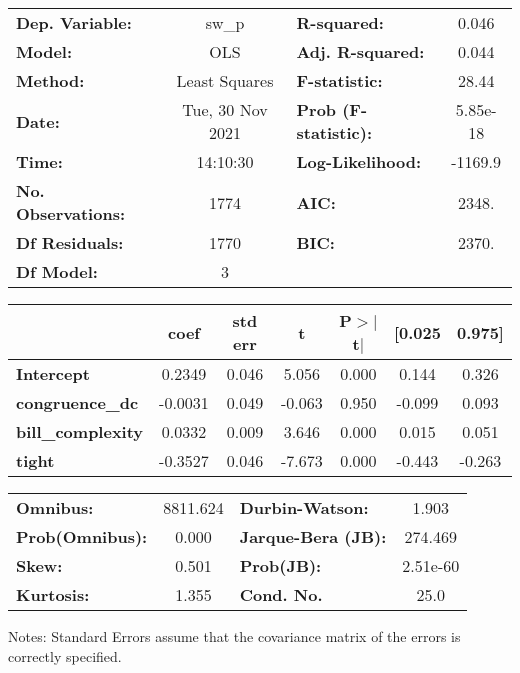 \begin{center}
\begin{tabular}{lclc}
\toprule
\textbf{Dep. Variable:}    &      sw\_p       & \textbf{  R-squared:         } &     0.046   \\
\textbf{Model:}            &       OLS        & \textbf{  Adj. R-squared:    } &     0.044   \\
\textbf{Method:}           &  Least Squares   & \textbf{  F-statistic:       } &     28.44   \\
\textbf{Date:}             & Tue, 30 Nov 2021 & \textbf{  Prob (F-statistic):} &  5.85e-18   \\
\textbf{Time:}             &     14:10:30     & \textbf{  Log-Likelihood:    } &   -1169.9   \\
\textbf{No. Observations:} &        1774      & \textbf{  AIC:               } &     2348.   \\
\textbf{Df Residuals:}     &        1770      & \textbf{  BIC:               } &     2370.   \\
\textbf{Df Model:}         &           3      & \textbf{                     } &             \\
\bottomrule
\end{tabular}
\begin{tabular}{lcccccc}
                          & \textbf{coef} & \textbf{std err} & \textbf{t} & \textbf{P$> |$t$|$} & \textbf{[0.025} & \textbf{0.975]}  \\
\midrule
\textbf{Intercept}        &       0.2349  &        0.046     &     5.056  &         0.000        &        0.144    &        0.326     \\
\textbf{congruence\_dc}   &      -0.0031  &        0.049     &    -0.063  &         0.950        &       -0.099    &        0.093     \\
\textbf{bill\_complexity} &       0.0332  &        0.009     &     3.646  &         0.000        &        0.015    &        0.051     \\
\textbf{tight}            &      -0.3527  &        0.046     &    -7.673  &         0.000        &       -0.443    &       -0.263     \\
\bottomrule
\end{tabular}
\begin{tabular}{lclc}
\textbf{Omnibus:}       & 8811.624 & \textbf{  Durbin-Watson:     } &    1.903  \\
\textbf{Prob(Omnibus):} &   0.000  & \textbf{  Jarque-Bera (JB):  } &  274.469  \\
\textbf{Skew:}          &   0.501  & \textbf{  Prob(JB):          } & 2.51e-60  \\
\textbf{Kurtosis:}      &   1.355  & \textbf{  Cond. No.          } &     25.0  \\
\bottomrule
\end{tabular}
\end{center}

Notes: \newline
 [1] Standard Errors assume that the covariance matrix of the errors is correctly specified.